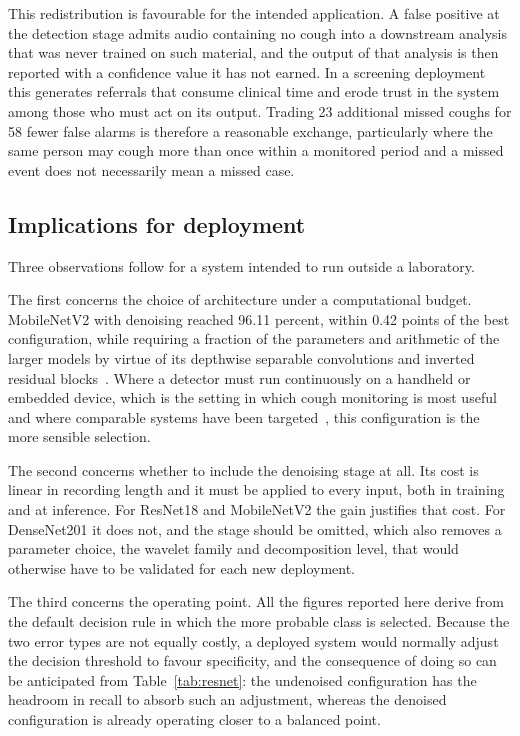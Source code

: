 This redistribution is favourable for the intended application. A false
positive at the detection stage admits audio containing no cough into a
downstream analysis that was never trained on such material, and the output of
that analysis is then reported with a confidence value it has not earned. In a
screening deployment this generates referrals that consume clinical time and
erode trust in the system among those who must act on its output. Trading 23
additional missed coughs for 58 fewer false alarms is therefore a reasonable
exchange, particularly where the same person may cough more than once within a
monitored period and a missed event does not necessarily mean a missed case.

\subsection{Implications for deployment}\label{sec:res-deploy}

Three observations follow for a system intended to run outside a laboratory.

The first concerns the choice of architecture under a computational budget.
MobileNetV2 with denoising reached 96.11 percent, within 0.42 points of the
best configuration, while requiring a fraction of the parameters and
arithmetic of the larger models by virtue of its depthwise separable
convolutions and inverted residual blocks~\cite{sandler2018}. Where a detector
must run continuously on a handheld or embedded device, which is the setting
in which cough monitoring is most useful and where comparable systems have
been targeted~\cite{hoyosbarcelo2018, karatas2021}, this configuration is the
more sensible selection.

The second concerns whether to include the denoising stage at all. Its cost is
linear in recording length and it must be applied to every input, both in
training and at inference. For ResNet18 and MobileNetV2 the gain justifies
that cost. For DenseNet201 it does not, and the stage should be omitted,
which also removes a parameter choice, the wavelet family and decomposition
level, that would otherwise have to be validated for each new deployment.

The third concerns the operating point. All the figures reported here derive
from the default decision rule in which the more probable class is selected.
Because the two error types are not equally costly, a deployed system would
normally adjust the decision threshold to favour specificity, and the
consequence of doing so can be anticipated from Table~\ref{tab:resnet}: the
undenoised configuration has the headroom in recall to absorb such an
adjustment, whereas the denoised configuration is already operating closer to
a balanced point.

